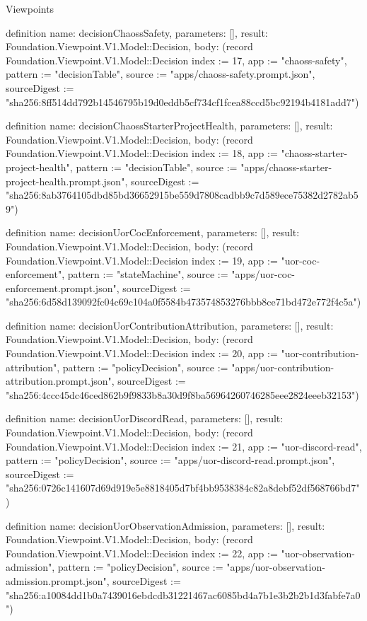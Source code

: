 \begin{lexlean}{Viewpoints}
\begin{semanticmodule}
definition{
  name: decisionChaossSafety,
  parameters: [],
  result: Foundation.Viewpoint.V1.Model::Decision,
  body: (record Foundation.Viewpoint.V1.Model::Decision {index := 17, app := "chaoss-safety", pattern := "decisionTable", source := "apps/chaoss-safety.prompt.json", sourceDigest := "sha256:8ff514dd792b14546795b19d0eddb5cf734cf1fcea88ccd5bc92194b4181add7"})
}

definition{
  name: decisionChaossStarterProjectHealth,
  parameters: [],
  result: Foundation.Viewpoint.V1.Model::Decision,
  body: (record Foundation.Viewpoint.V1.Model::Decision {index := 18, app := "chaoss-starter-project-health", pattern := "decisionTable", source := "apps/chaoss-starter-project-health.prompt.json", sourceDigest := "sha256:8ab3764105dbd85bd36652915be559d7808cadbb9c7d589ece75382d2782ab59"})
}

definition{
  name: decisionUorCocEnforcement,
  parameters: [],
  result: Foundation.Viewpoint.V1.Model::Decision,
  body: (record Foundation.Viewpoint.V1.Model::Decision {index := 19, app := "uor-coc-enforcement", pattern := "stateMachine", source := "apps/uor-coc-enforcement.prompt.json", sourceDigest := "sha256:6d58d139092fc04c69c104a0f5584b473574853276bbb8ce71bd472e772f4c5a"})
}

definition{
  name: decisionUorContributionAttribution,
  parameters: [],
  result: Foundation.Viewpoint.V1.Model::Decision,
  body: (record Foundation.Viewpoint.V1.Model::Decision {index := 20, app := "uor-contribution-attribution", pattern := "policyDecision", source := "apps/uor-contribution-attribution.prompt.json", sourceDigest := "sha256:4ccc45dc46ced862b9f9833b8a30d9f8ba56964260746285eee2824eeeb32153"})
}

definition{
  name: decisionUorDiscordRead,
  parameters: [],
  result: Foundation.Viewpoint.V1.Model::Decision,
  body: (record Foundation.Viewpoint.V1.Model::Decision {index := 21, app := "uor-discord-read", pattern := "policyDecision", source := "apps/uor-discord-read.prompt.json", sourceDigest := "sha256:0726c141607d69d919e5e8818405d7bf4bb9538384c82a8debf52df568766bd7"})
}

definition{
  name: decisionUorObservationAdmission,
  parameters: [],
  result: Foundation.Viewpoint.V1.Model::Decision,
  body: (record Foundation.Viewpoint.V1.Model::Decision {index := 22, app := "uor-observation-admission", pattern := "policyDecision", source := "apps/uor-observation-admission.prompt.json", sourceDigest := "sha256:a10084dd1b0a7439016ebdcdb31221467ac6085bd4a7b1e3b2b2b1d3fabfe7a0"})
}


\end{semanticmodule}
\end{lexlean}
